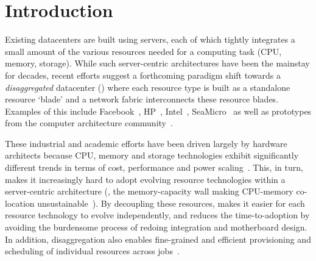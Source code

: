 \vspace{-0.1in}
\section{Introduction}
\label{sec:intro}
\vspace{-0.05in}
Existing datacenters are built using servers, each of which tightly integrates a small amount of the various resources needed for a computing task (CPU, memory, storage). While such server-centric architectures have been the mainstay for decades, recent efforts suggest a forthcoming paradigm shift towards a {\em disaggregated} datacenter (\dis) where each resource type is built as a standalone resource `blade' and a network fabric interconnects these resource blades. Examples of this include Facebook~\cite{fdr}, HP~\cite{hptm}, Intel~\cite{rsa}, SeaMicro~\cite{seamicro} as well as prototypes from the computer architecture community~\cite{firebox, sonuma, ddcHwDesign1}. 

These industrial and academic efforts have been driven largely by hardware architects because CPU, memory and storage technologies exhibit significantly different trends in terms of cost, performance and power scaling~\cite{memristors,nvram,reg-ex-hardware,gpus}. This, in turn, makes it increasingly hard to adopt evolving resource technologies within a server-centric architecture (\eg, the memory-capacity wall making CPU-memory co-location unsustainable~\cite{ddcHwDesign1}). By decoupling these resources, \dis makes it easier for each resource technology to evolve independently, and reduces the time-to-adoption by avoiding the burdensome process of redoing integration and motherboard design. In addition, disaggregation also enables fine-grained and efficient provisioning and scheduling of individual resources across jobs~\cite{hotnets}. 

